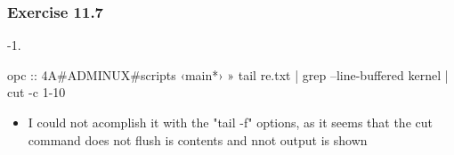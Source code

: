 \documentclass[a4paper]{article}
\begin{document}
\subsubsection{Exercise 11.7}

{-\allowbreak}1.

\begin{plain}
opc :: 4A#ADMINUX#scripts ‹main*› » tail re.txt | grep --line-buffered kernel | cut -c 1-10
\end{plain}

\begin{itemize}
\item 
I could not acomplish it with the "tail {-\allowbreak}f" options, as it seems that the cut command does not flush is contents and nnot output is shown
\end{itemize}

\clearpage
\end{document}
